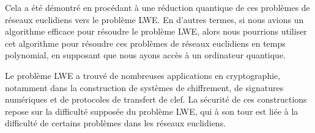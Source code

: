 Cela a été démontré en procédant à une réduction quantique de ces problèmes de réseaux euclidiens vers le problème LWE. En d'autres termes, si nous avions un algorithme efficace pour résoudre le problème LWE, alors nous pourrions utiliser cet algorithme pour résoudre ces problèmes de réseaux euclidiens en temps polynomial, en supposant que nous ayons accès à un ordinateur quantique.


Le problème LWE a trouvé de nombreuses applications en cryptographie, notamment dans la construction de systèmes de chiffrement, de signatures numériques et de protocoles de transfert de clef. La sécurité de ces constructions repose sur la difficulté supposée du problème LWE, qui à son tour est liée à la difficulté de certains problèmes dans les réseaux euclidiens.

